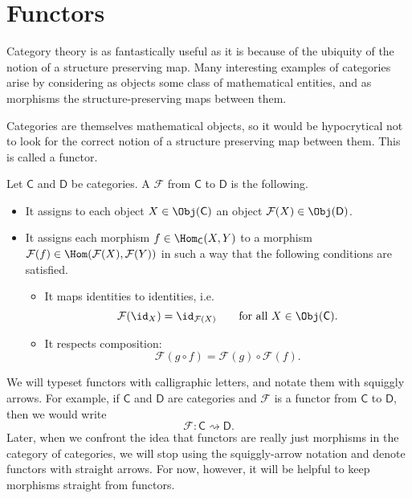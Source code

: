 \documentclass[notes.tex]{subfiles}
\begin{document}
\section{Functors}\label{sec:functors}

Category theory is as fantastically useful as it is because of the ubiquity of the notion of a structure preserving map. Many interesting examples of categories arise by considering as objects some class of mathematical entities, and as morphisms the structure-preserving maps between them.

Categories are themselves mathematical objects, so it would be hypocrytical not to look for the correct notion of a structure preserving map between them. This is called a functor.

\begin{definition}[functor]
  \label{def:functor}
  Let $\mathsf{C}$ and $\mathsf{D}$ be categories. A  $\mathcal{F}$ from $\mathsf{C}$ to $\mathsf{D}$ is the following.
  \begin{itemize}
    \item It assigns to each object $X \in \Obj(\mathsf{C})$ an object $\mathcal{F}(X) \in \Obj(\mathsf{D})$.

    \item It assigns each morphism $f \in \Hom_{\mathsf{C}}(X, Y)$ to a morphism $\mathcal{F}(f) \in \Hom(\mathcal{F}(X), \mathcal{F}(Y))$ in such a way that the following conditions are satisfied.
      \begin{itemize}
        \item It maps identities to identities, i.e.\
          \begin{equation*}
            \mathcal{F}(\id_{X}) = \id_{\mathcal{F}(X)}\qquad \text{for all } X \in \Obj(\mathsf{C}).
          \end{equation*}
        \item It respects composition:
          \begin{equation*}
            \mathcal{F}(g \circ f) = \mathcal{F}(g) \circ \mathcal{F}(f).
          \end{equation*}
      \end{itemize}
  \end{itemize}
\end{definition}

\begin{notation}
  We will typeset functors with calligraphic letters, and notate them with squiggly arrows. For example, if $\mathsf{C}$ and $\mathsf{D}$ are categories and $\mathcal{F}$ is a functor from $\mathsf{C}$ to $\mathsf{D}$, then we would write
  \begin{equation*}
    \mathcal{F}\colon \mathsf{C} \rightsquigarrow \mathsf{D}.
  \end{equation*}
  Later, when we confront the idea that functors are really just morphisms in the category of categories, we will stop using the squiggly-arrow notation and denote functors with straight arrows. For now, however, it will be helpful to keep morphisms straight from functors.
\end{notation}
\end{document}
